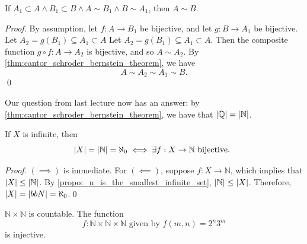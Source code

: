 \documentclass[notoc,notitlepage]{tufte-book}
\begin{document}
\begin{crly}\label{crly:cantor_schroder_bernstein_theorem_restated}
  If $A_1 \subset A \land B_1 \subset B \land A \sim B_1 \land B \sim A_1$, then $A \sim B$.
\end{crly}

\begin{proof}
  By assumption, let $f : A \to B_1$ be bijective, and let $g : B \to A_1$ be bijective. Let $A_2 = g(B_1) \subseteq A_1 \subset A$ Let $A_2 = g(B_1) \subseteq A_1 \subset A$. Then the composite function $g \circ f : A \to A_2$ is bijective, and so $A \sim A_2$. By \cref{thm:cantor_schroder_bernstein_theorem}, we have
  \begin{equation*}
    A \sim A_2 \sim A_1 \sim B.
  \end{equation*}\qed
\end{proof}

\begin{eg}
  Our question from last lecture now has an answer: by \cref{thm:cantor_schroder_bernstein_theorem}, we have that $\left|\mathbb{Q}\right| = \left|\mathbb{N}\right|$.
\end{eg}

\begin{propo}\label{propo:denumerability_check}
  If $X$ is infinite, then
  \begin{equation*}
    \left|X\right| = \left|\mathbb{N}\right| = \aleph_0 \iff \exists f : X \to \mathbb{N} \text{ bijective. }
  \end{equation*}
\end{propo}

\begin{proof}
  $(\implies)$ is immediate. For $(\impliedby)$, suppose $f : X \to \mathbb{N}$, which implies that $\left|X\right| \leq \left|\mathbb{N}\right|$. By \cref{propo:_n_is_the_smallest_infinite_set}, $\left|\mathbb{N}\right| \leq \left|X\right|$. Therefore, $\left|X\right| = \left|bbN\right| = \aleph_0$.\qed
\end{proof}

\begin{eg}
  $\mathbb{N} \times \mathbb{N}$ is countable. The function
  \begin{equation*}
    f : \mathbb{N} \times \mathbb{N} \times \mathbb{N} \text{ given by } f(m, n) = 2^n 3^m
  \end{equation*}
  is injective.
\end{eg}
\end{document}

